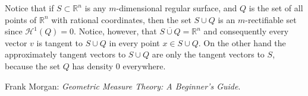 \documentclass[12pt]{article}
\renewcommand{\H}{\mathcal H}
\newcommand{\R}{\mathbb R}
\begin{document}
Notice that if $S\subset \R^n$ is any $m$-dimensional regular surface, 
and $Q$ is the set of all points of $\R^n$ with rational coordinates, then the set $S\cup Q$ is an $m$-rectifiable set since $\H^1(Q)=0$. Notice, however, that $\overline{S\cup Q} = \R^n$ and consequently every vector $v$ is tangent to $S\cup Q$ in every point $x\in S\cup Q$. On the other hand the approximately tangent vectors to $S\cup Q$ are only the tangent vectors to $S$, because the set $Q$ has density $0$ everywhere.

\begin{thebibliography}{9}
Frank Morgan: \emph{Geometric Measure Theory: A Beginner's Guide}.
\end{thebibliography}
\end{document}
